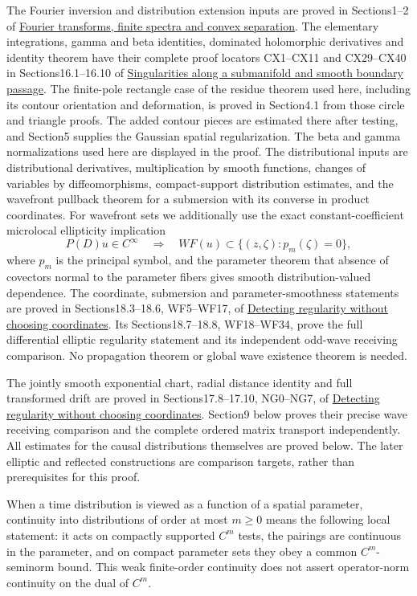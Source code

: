\documentclass[
  11pt,
]{article}
\begin{document}
The Fourier inversion and distribution extension inputs are proved in
Sections1--2 of \href{prerequisite-bridges.pdf}{Fourier transforms,
finite spectra and convex separation}. The elementary integrations,
gamma and beta identities, dominated holomorphic derivatives and
identity theorem have their complete proof locators CX1--CX11 and
CX29--CX40 in Sections16.1--16.10 of
\href{conormal-transmission.pdf}{Singularities along a submanifold and
smooth boundary passage}. The finite-pole rectangle case of the residue
theorem used here, including its contour orientation and deformation, is
proved in Section4.1 from those circle and triangle proofs. The added
contour pieces are estimated there after testing, and Section5 supplies
the Gaussian spatial regularization. The beta and gamma normalizations
used here are displayed in the proof. The distributional inputs are
distributional derivatives, multiplication by smooth functions, changes
of variables by diffeomorphisms, compact-support distribution estimates,
and the wavefront pullback theorem for a submersion with its converse in
product coordinates. For wavefront sets we additionally use the exact
constant-coefficient microlocal ellipticity implication \[
 P(D)u\in C^\infty\quad\Longrightarrow\quad
 WF(u)\subset\{(z,\zeta):p_m(\zeta)=0\},
 \tag{W3}
\] where \(p_m\) is the principal symbol, and the parameter theorem that
absence of covectors normal to the parameter fibers gives smooth
distribution-valued dependence. The coordinate, submersion and
parameter-smoothness statements are proved in Sections18.3--18.6,
WF5--WF17, of \href{geometric-microlocal-calculus.pdf}{Detecting
regularity without choosing coordinates}. Its Sections18.7--18.8,
WF18--WF34, prove the full differential elliptic regularity statement
and its independent odd-wave receiving comparison. No propagation
theorem or global wave existence theorem is needed.

The jointly smooth exponential chart, radial distance identity and full
transformed drift are proved in Sections17.8--17.10, NG0--NG7, of
\href{geometric-microlocal-calculus.pdf}{Detecting regularity without
choosing coordinates}. Section9 below proves their precise wave
receiving comparison and the complete ordered matrix transport
independently. All estimates for the causal distributions themselves are
proved below. The later elliptic and reflected constructions are
comparison targets, rather than prerequisites for this proof.

When a time distribution is viewed as a function of a spatial parameter,
continuity into distributions of order at most \(m\geq0\) means the
following local statement: it acts on compactly supported \(C^m\) tests,
the pairings are continuous in the parameter, and on compact parameter
sets they obey a common \(C^m\)-seminorm bound. This weak finite-order
continuity does not assert operator-norm continuity on the dual of
\(C^m\).
\end{document}
